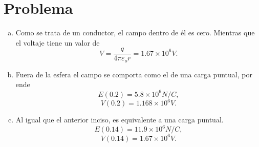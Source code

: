 \section*{Problema}

\begin{enumerate}[a)]
	\item Como se trata de un conductor, el campo dentro de él es cero. Mientras que el voltaje tiene un valor de
		$$ V = \frac{q}{4\pi \varepsilon _o r} = 1.67\times 10^{6} V. $$
	\item Fuera de la esfera el campo se comporta como el de una carga puntual, por ende
		$$ E(0.2) = 5.8\times 10^{6} N/C, $$
		$$ V(0.2) = 1.168\times 10^{6} V. $$
	\item Al igual que el anterior inciso, es equivalente a una carga puntual.
		$$ E(0.14) = 11.9\times 10^{6} N/C, $$
		$$ V(0.14) = 1.67\times 10^{6} V. $$
\end{enumerate}










